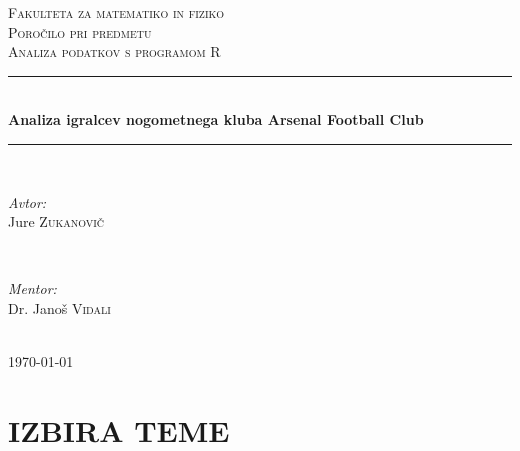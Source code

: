 \documentclass[11pt,a4paper]{article}
\begin{document}
\begin{titlepage}
\newcommand{\HRule}{\rule{\linewidth}{0.5mm}}
\center

\textsc{\LARGE Fakulteta za matematiko in fiziko}\\[3 cm]
\textsc{\Large Poročilo pri predmetu}\\[0.5cm]
\textsc{\large Analiza podatkov s programom R}\\[2 cm]
\HRule \\[0.4cm]
{ \huge \bfseries Analiza igralcev nogometnega kluba Arsenal Football Club }\\[0.4cm] 
\HRule \\[6 cm]


\begin{minipage}{0.4\textwidth}
\begin{flushleft} \large
\emph{Avtor:}\\
Jure \textsc{Zukanovič}
\end{flushleft}
\end{minipage}
~
\begin{minipage}{0.4\textwidth}
\begin{flushright} \large
\emph{Mentor:} \\
Dr. Janoš \textsc{Vidali}
\end{flushright}
\end{minipage}\\[2 cm]

{\large \today}\\[3cm] 


\end{titlepage}

\section{IZBIRA TEME}
\end{document}
